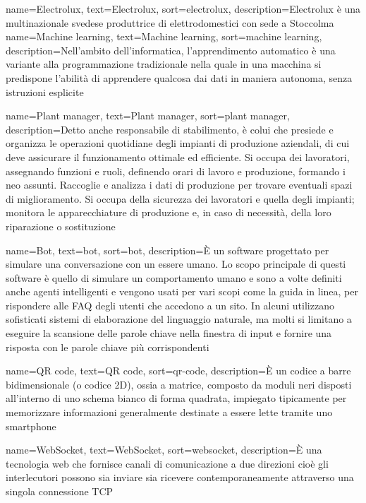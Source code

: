 {
	name={Electrolux},
	text=Electrolux,
	sort=electrolux,
	description={Electrolux è una multinazionale svedese produttrice di elettrodomestici con sede a Stoccolma}
}
{
	name={Machine learning},
	text=Machine learning,
	sort=machine learning,
	description={Nell'ambito dell'informatica, l'apprendimento automatico è una variante alla programmazione tradizionale nella quale in una macchina si predispone l'abilità di apprendere qualcosa dai dati in maniera autonoma, senza istruzioni esplicite}
}

{
	name={Plant manager},
	text=Plant manager,
	sort=plant manager,
	description={Detto anche responsabile di stabilimento, è colui che presiede e organizza le operazioni quotidiane degli impianti di produzione aziendali, di cui deve assicurare il funzionamento ottimale ed efficiente. Si occupa dei lavoratori, assegnando funzioni e ruoli, definendo orari di lavoro e produzione, formando i neo assunti. Raccoglie e analizza i dati di produzione per trovare eventuali spazi di miglioramento. Si occupa della sicurezza dei lavoratori e quella degli impianti; monitora le apparecchiature di produzione e, in caso di necessità, della loro riparazione o sostituzione}
}

{
	name={Bot},
	text=bot,
	sort=bot,
	description={È un software progettato per simulare una conversazione con un essere umano. Lo scopo principale di questi software è quello di simulare un comportamento umano e sono a volte definiti anche agenti intelligenti e vengono usati per vari scopi come la guida in linea, per rispondere alle FAQ degli utenti che accedono a un sito. In alcuni utilizzano sofisticati sistemi di elaborazione del linguaggio naturale, ma molti si limitano a eseguire la scansione delle parole chiave nella finestra di input e fornire una risposta con le parole chiave più corrispondenti}
}

{
	name={QR code},
	text=QR code,
	sort=qr-code,
	description={È un codice a barre bidimensionale (o codice 2D), ossia a matrice, composto da moduli neri disposti all'interno di uno schema bianco di forma quadrata, impiegato tipicamente per memorizzare informazioni generalmente destinate a essere lette tramite uno smartphone}
}

{
	name={WebSocket},
	text=WebSocket,
	sort=websocket,
	description={È una tecnologia web che fornisce canali di comunicazione a due direzioni cioè gli interlecutori possono sia inviare sia ricevere contemporaneamente attraverso una singola connessione TCP}
}

